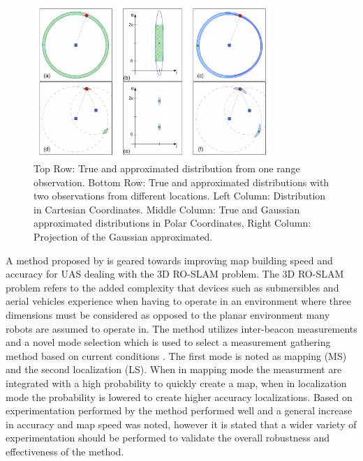 \documentclass[conference]{IEEEtran}
\begin{document}
	\begin{figure}[h!]
		
		\centering
		
		\includegraphics[width=90mm]{ROP_djugash.png}
		
		\caption{Top Row: True and approximated distribution from one range observation. Bottom Row: True and approximated distributions with two observations from different locations. Left Column: Distribution in Cartesian Coordinates. Middle Column: True and Gaussian approximated distributions in Polar Coordinates, Right Column: Projection of the Gaussian approximated. \cite{Djugash2008}} 
		
		\label{ROP_djugash}
		
	\end{figure}
	

	
	
	
	
	
	A method proposed by \cite{Dios2015} is geared towards improving map building speed and accuracy for UAS dealing with the 3D RO-SLAM problem. The 3D RO-SLAM problem refers to the added complexity that devices such as submersibles \cite{Newman} and aerial vehicles experience when having to operate in an environment where three dimensions must be considered as opposed to the planar environment many robots are assumed to operate in. The method utilizes inter-beacon measurements and a novel mode selection which is used to select a measurement gathering method based on current conditions \cite{Dios2015}. The first mode is noted as mapping (MS) and the second localization (LS). When in mapping mode the measurment are integrated with a high probability to quickly create a map, when in localization mode the probability is lowered to create higher accuracy localizations. Based on experimentation performed by \cite{Dios2015} the method performed well and a general increase in accuracy and map speed was noted, however it is stated that a wider variety of experimentation should be performed to validate the overall robustness and effectiveness of the method.
	
\end{document}
